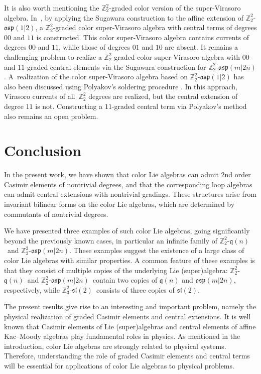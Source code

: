 \documentclass[pdftex]{sigma}
\numberwithin{equation}{section}
\theoremstyle{definition}
\def\Z2{\mathbb{Z}_2^2}
\def\osp{\mathfrak{osp}}
\def\sl{\mathfrak{sl}}
\def\qq{$\Z2$-$\q(n)$}
\def\q{\mathfrak{q}}
\def\Zsl{$\mathbb{Z}_3^2$-$\sl(2)$}
\def\Zosp{$\Z2$-$\osp(m|2n)$}
\begin{document}
It is also worth mentioning the $\Z2$-graded color version of the super-Virasoro algebra.
In~\cite{AiSe}, by applying the Sugawara construction to the affine extension of $\Z2$-$\osp(1|2)$, a $\Z2$-graded color super-Virasoro algebra with central terms of degrees $00$ and $11$ is constructed.
This color super-Virasoro algebra contains currents of degrees $00$ and $11$, while those of degrees $01$ and $10$ are absent.
It remains a challenging problem to realize a $\Z2$-graded color super-Virasoro algebra with $00$- and $11$-graded central elements via the Sugawara construction for \Zosp.
A~realization of the color super-Virasoro algebra based on $\Z2$-$\osp(1|2)$ has also been discussed using Polyakov's soldering procedure \cite{AFITTsuper}.
In this approach, Virasoro currents of all~$\Z2$ degrees are realized, but the central extension of degree $11$ is not.
Constructing a $11$-graded central term via Polyakov's method also remains an open problem.

\section{Conclusion} \label{SEC:Conclusion}

In the present work, we have shown that color Lie algebras can admit 2nd order Casimir elements of nontrivial degrees, and that the corresponding loop algebras can admit central extensions with nontrivial gradings.
These structures arise from invariant bilinear forms on the color Lie algebras, which are determined by commutants of nontrivial degrees.

We have presented three examples of such color Lie algebras, going significantly beyond the previously known cases, in particular an infinite family of \qq\ and \Zosp.
These examples suggest the existence of a large class of color Lie algebras with similar properties.
A common feature of these examples is that they consist of multiple copies of the underlying Lie (super)algebra: \qq\ and \Zosp\ contain two copies of $\q(n)$ and $\osp(m|2n)$, respectively, while \Zsl\ consists of three copies of $\sl(2)$.

The present results give rise to an interesting and important problem, namely the physical realization of graded Casimir elements and central extensions.
It is well known that Casimir elements of Lie (super)algebras and central elements of affine Kac–Moody algebras play fundamental roles in physics.
As mentioned in the introduction, color Lie algebras are strongly related to physical systems.
Therefore, understanding the role of graded Casimir elements and central terms will be essential for applications of color Lie algebras to physical problems.
\end{document}
